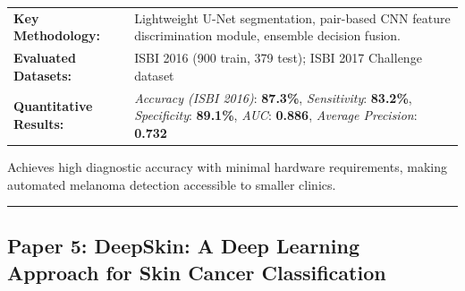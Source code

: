 \documentclass[10pt,a4paper]{article}
\begin{document}
\vspace{4pt}
\begin{tabularx}{\linewidth}{p{3.2cm}X}
\toprule
\textbf{Key Methodology:} & Lightweight U-Net segmentation, pair-based CNN feature discrimination module, ensemble decision fusion. \\
\textbf{Evaluated Datasets:} & ISBI 2016 (900 train, 379 test); ISBI 2017 Challenge dataset \\
\textbf{Quantitative Results:} & \textit{Accuracy (ISBI 2016)}: \textbf{87.3\%}, \textit{Sensitivity}: \textbf{83.2\%}, \textit{Specificity}: \textbf{89.1\%}, \textit{AUC}: \textbf{0.886}, \textit{Average Precision}: \textbf{0.732} \\
\bottomrule
\end{tabularx}
\vspace{4pt}
\begin{tcolorbox}[utilitybox,title=Clinical Utility and Real-World Impact]
Achieves high diagnostic accuracy with minimal hardware requirements, making automated melanoma detection accessible to smaller clinics.
\end{tcolorbox}
\vspace{12pt}
\hrule
\vspace{12pt}
\subsection*{Paper 5: DeepSkin: A Deep Learning Approach for Skin Cancer Classification}
\end{document}

